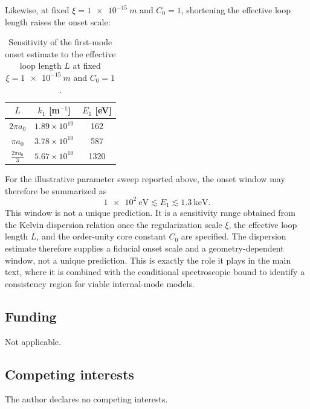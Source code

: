 \documentclass[pdflatex,sn-mathphys-num]{sn-jnl}
\begin{document}
        Likewise, at fixed $\xi=\SI{1e-15}{m}$ and $C_0=1$, shortening the effective loop length raises the onset scale:
        \begin{table}[htbp]
            \centering
            \caption{Sensitivity of the first-mode onset estimate to the effective loop length $L$ at fixed $\xi=\SI{1e-15}{m}$ and $C_0=1$.}
            \begin{tabular}{ccc}
                \toprule
                $L$ & $k_1$ [m$^{-1}$] & $E_1$ [eV] \\
                \midrule
                $2\pi a_0$      & $1.89\times 10^{10}$ & 162  \\
                $\pi a_0$       & $3.78\times 10^{10}$ & 587  \\
                $\tfrac{2\pi a_0}{3}$ & $5.67\times 10^{10}$ & 1320 \\
                \bottomrule
            \end{tabular}
            \label{tab:L-sensitivity}
        \end{table}

        For the illustrative parameter sweep reported above, the onset window may therefore be summarized as
        \begin{equation}
            \SI{1e2}{\electronvolt} \lesssim E_1 \lesssim \SI{1.3}{\kilo\electronvolt}.
        \end{equation}
        This window is not a unique prediction. It is a sensitivity range obtained from the Kelvin dispersion relation once the regularization scale $\xi$, the effective loop length $L$, and the order-unity core constant $C_0$ are specified. The dispersion estimate therefore supplies a fiducial onset scale and a geometry-dependent window, not a unique prediction. This is exactly the role it plays in the main text, where it is combined with the conditional spectroscopic bound to identify a consistency region for viable internal-mode models.

        \backmatter

        \subsection*{Funding}
            Not applicable.

        \subsection*{Competing interests}
            The author declares no competing interests.
\end{document}
